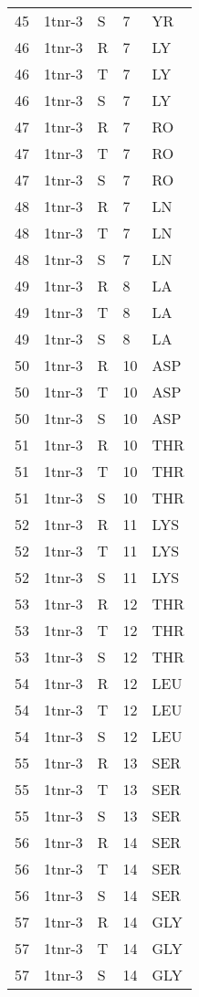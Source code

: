 \begin{longtable}[l]{l|l|l|l|l}
	45 & 1tnr-3 & S & 7 & YR \\
	46 & 1tnr-3 & R & 7 & LY \\
	46 & 1tnr-3 & T & 7 & LY \\
	46 & 1tnr-3 & S & 7 & LY \\
	47 & 1tnr-3 & R & 7 & RO \\
	47 & 1tnr-3 & T & 7 & RO \\
	47 & 1tnr-3 & S & 7 & RO \\
	48 & 1tnr-3 & R & 7 & LN \\
	48 & 1tnr-3 & T & 7 & LN \\
	48 & 1tnr-3 & S & 7 & LN \\
	49 & 1tnr-3 & R & 8 & LA \\
	49 & 1tnr-3 & T & 8 & LA \\
	49 & 1tnr-3 & S & 8 & LA \\
	50 & 1tnr-3 & R & 10 & ASP \\
	50 & 1tnr-3 & T & 10 & ASP \\
	50 & 1tnr-3 & S & 10 & ASP \\
	51 & 1tnr-3 & R & 10 & THR \\
	51 & 1tnr-3 & T & 10 & THR \\
	51 & 1tnr-3 & S & 10 & THR \\
	52 & 1tnr-3 & R & 11 & LYS \\
	52 & 1tnr-3 & T & 11 & LYS \\
	52 & 1tnr-3 & S & 11 & LYS \\
	53 & 1tnr-3 & R & 12 & THR \\
	53 & 1tnr-3 & T & 12 & THR \\
	53 & 1tnr-3 & S & 12 & THR \\
	54 & 1tnr-3 & R & 12 & LEU \\
	54 & 1tnr-3 & T & 12 & LEU \\
	54 & 1tnr-3 & S & 12 & LEU \\
	55 & 1tnr-3 & R & 13 & SER \\
	55 & 1tnr-3 & T & 13 & SER \\
	55 & 1tnr-3 & S & 13 & SER \\
	56 & 1tnr-3 & R & 14 & SER \\
	56 & 1tnr-3 & T & 14 & SER \\
	56 & 1tnr-3 & S & 14 & SER \\
	57 & 1tnr-3 & R & 14 & GLY \\
	57 & 1tnr-3 & T & 14 & GLY \\
	57 & 1tnr-3 & S & 14 & GLY \\

\end{longtable}
